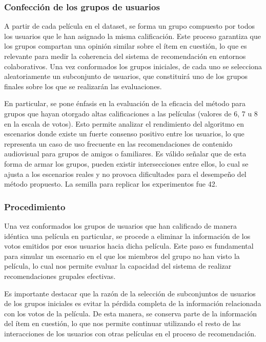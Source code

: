 \documentclass[twocolumn, fontsize=10pt]{article}
\begin{document}
 \subsubsection{Confección de los grupos de usuarios}
 A partir de cada película en el dataset, se forma un grupo compuesto por todos los usuarios que le han asignado la misma calificación. Este proceso garantiza que los grupos compartan una opinión similar sobre el ítem en cuestión, lo que es relevante para medir la coherencia del sistema de recomendación en entornos colaborativos. Una vez conformados los grupos iniciales, de cada uno se selecciona aleatoriamente un subconjunto de usuarios, que constituirá uno de los grupos finales sobre los que se realizarán las evaluaciones.

En particular, se pone énfasis en la evaluación de la eficacia del método para grupos que hayan otorgado altas calificaciones a las películas (valores de 6, 7 u 8 en la escala de votos). Esto permite analizar el rendimiento del algoritmo en escenarios donde existe un fuerte consenso positivo entre los usuarios, lo que representa un caso de uso frecuente en las recomendaciones de contenido audiovisual para grupos de amigos o familiares.
Es válido señalar que de esta forma de armar los grupos, pueden existir intersecciones entre ellos, lo cual se ajusta a los escenarios reales y no provoca dificultades para el desempeño del método propuesto. La semilla para replicar los experimentos fue 42.
 
\subsubsection{Procedimiento}

Una vez conformados los grupos de usuarios que han calificado de manera idéntica una película en particular, se procede a eliminar la información de los votos emitidos por esos usuarios hacia dicha película. Este paso es fundamental para simular un escenario en el que los miembros del grupo no han visto la película, lo cual nos permite evaluar la capacidad del sistema de realizar recomendaciones grupales efectivas.

Es importante destacar que la razón de la selección de subconjuntos de usuarios de los grupos iniciales es evitar la pérdida completa de la información relacionada con los votos de la película. De esta manera, se conserva parte de la información del ítem en cuestión, lo que nos permite continuar utilizando el resto de las interacciones de los usuarios con otras películas en el proceso de recomendación.
\end{document}
